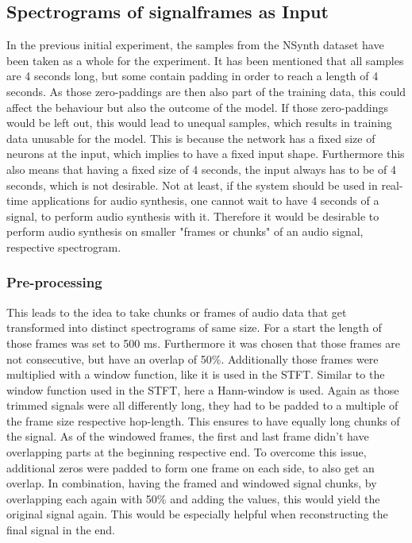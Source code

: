 \subsection{Spectrograms of signalframes as Input}
In the previous initial experiment, the samples from the NSynth dataset have been taken as a whole for the experiment. It has been mentioned that all samples are 4 seconds long, but some contain padding in order to reach a length of 4 seconds. As those zero-paddings are then also part of the training data, this could affect the behaviour but also the outcome of the model. If those zero-paddings would be left out, this would lead to unequal samples, which results in training data unusable for the model. This is because the network has a fixed size of neurons at the input, which implies to have a fixed input shape. Furthermore this also means that having a fixed size of 4 seconds, the input always has to be of 4 seconds, which is not desirable. Not at least, if the system should be used in real-time applications for audio synthesis, one cannot wait to have 4 seconds of a signal, to perform audio synthesis with it. Therefore it would be desirable to perform audio synthesis on smaller "frames or chunks" of an audio signal, respective spectrogram. 

\subsubsection{Pre-processing}
This leads to the idea to take chunks or frames of audio data that get transformed into distinct spectrograms of same size. For a start the length of those frames was set to 500 ms. Furthermore it was chosen that those frames are not consecutive, but have an overlap of 50\%. Additionally those frames were multiplied with a window function, like it is used in the STFT. Similar to the window function used in the STFT, here a Hann-window is used. Again as those trimmed signals were all differently long, they had to be padded to a multiple of the frame size respective hop-length. This ensures to have equally long chunks of the signal. As of the windowed frames, the first and last frame didn't have overlapping parts at the beginning respective end. To overcome this issue, additional zeros were padded to form one frame on each side, to also get an overlap. In combination, having the framed and windowed signal chunks, by overlapping each again with 50\% and adding the values, this would yield the original signal again. This would be especially helpful when reconstructing the final signal in the end. 


